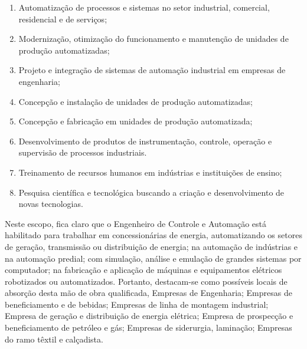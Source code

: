 \begin{enumerate}
	\item Automatização de processos e sistemas no setor industrial, comercial, residencial e de serviços;
	\item Modernização, otimização do funcionamento e manutenção de unidades de produção automatizadas;
	\item Projeto e integração de sistemas de automação industrial em empresas de engenharia;
	\item Concepção e instalação de unidades de produção automatizadas;
	\item Concepção e fabricação em unidades de produção automatizada;
	\item Desenvolvimento de produtos de instrumentação, controle, operação e supervisão de processos industriais.
	\item Treinamento de recursos humanos em indústrias e instituições de ensino;
	\item Pesquisa científica e tecnológica buscando a criação e desenvolvimento de novas tecnologias.
\end{enumerate}

Neste escopo, fica claro que o Engenheiro de Controle e Automação está habilitado para trabalhar em
concessionárias de energia, automatizando os setores de geração, transmissão ou
distribuição de energia; na automação de indústrias e na automação predial; com
simulação, análise e emulação de grandes sistemas por computador; na fabricação e
aplicação de máquinas e equipamentos elétricos robotizados ou automatizados. Portanto, destacam-se
como possíveis locais de absorção desta mão de obra qualificada, Empresas de Engenharia; Empresas de beneficiamento e
de bebidas; Empresas de linha de montagem industrial; Empresa de geração e distribuição de energia
elétrica; Empresa de prospecção e beneficiamento de petróleo e gás; Empresas de siderurgia,
laminação; Empresas do ramo têxtil e calçadista.

